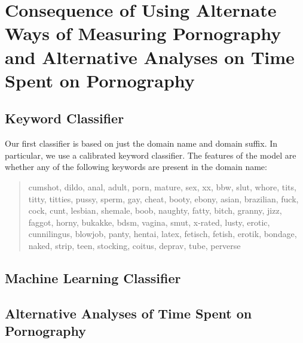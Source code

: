 \documentclass[12pt, letterpaper]{article}
\begin{document}
\FloatBarrier
\section{Consequence of Using Alternate Ways of Measuring Pornography and Alternative Analyses on Time Spent on Pornography}
\subsection{Keyword Classifier}
Our first classifier is based on just the domain name and domain suffix. In particular, we use a calibrated keyword classifier. The features of the model are whether any of the following keywords are present in the domain name:

\begin{quote}

cumshot, dildo, anal, adult, porn, mature, sex, xx, bbw, slut, whore, tits, titty, titties, pussy, sperm, gay, cheat, booty, ebony, asian, brazilian, fuck, cock, cunt, lesbian, shemale, boob, naughty, fatty, bitch, granny, jizz, faggot, horny, bukakke, bdsm, vagina, smut, x-rated, lusty, erotic, cunnilingus, blowjob, panty, hentai, latex, fetisch, fetish, erotik, bondage, naked, strip, teen, stocking, coitus, deprav, tube, perverse 

\end{quote}
\subsection{Machine Learning Classifier}


\subsection{Alternative Analyses of Time Spent on Pornography}
\end{document}
